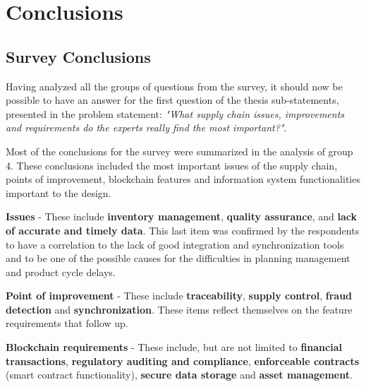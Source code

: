 
\section{Conclusions}

\subsection{Survey Conclusions}

Having analyzed all the groups of questions from the survey, it should now be possible to have an answer for the first question of the thesis sub-statements, presented in the problem statement: \textit{"What supply chain issues, improvements and requirements do the experts really find the most important?"}.

Most of the conclusions for the survey were summarized in the analysis of group 4. These conclusions included the most important issues of the supply chain, points of improvement, blockchain features and information system functionalities important to the design.


\par \textbf{Issues} - These include \textbf{inventory management}, \textbf{quality assurance}, \textbf{} and \textbf{lack of accurate and timely data}. This last item was confirmed by the respondents to have a correlation to the lack of good integration and synchronization tools and to be one of the possible causes for the difficulties in planning management and product cycle delays.

\par \textbf{Point of improvement} - These include \textbf{traceability}, \textbf{supply control}, \textbf{fraud detection} and \textbf{synchronization}. These items reflect themselves on the feature requirements that follow up.

\par \textbf{Blockchain requirements} - These include, but are not limited to \textbf{financial transactions}, \textbf{regulatory auditing and compliance}, \textbf{enforceable contracts} (smart contract functionality), \textbf{secure data storage} and \textbf{asset management}.

